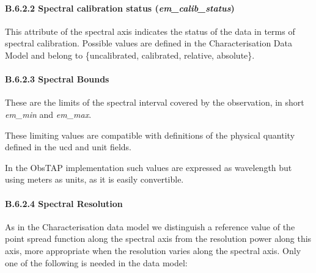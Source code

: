 \documentclass[11pt,a4paper]{ivoa}
\begin{document}
\paragraph{B.6.2.2 Spectral calibration status (\emph{em\_calib\_status})}
This attribute of the spectral axis indicates the status of the data in terms of spectral calibration. Possible values
are defined in the Characterisation Data Model and belong to \{uncalibrated, calibrated,  relative, absolute\}.

\paragraph{B.6.2.3 Spectral Bounds}
\label{bkm:Ref419133828}These are the limits of the spectral interval covered by the observation, in short \emph{em\_min} and
\emph{em\_max}.

These limiting values are compatible with definitions of the physical quantity defined in the ucd and unit fields.

In the ObsTAP implementation such values are expressed as wavelength but using meters as units, as it is easily
convertible.

\paragraph{B.6.2.4 Spectral Resolution}
As in the Characterisation data model we distinguish a reference value of the point spread function along the spectral
axis from the resolution power along this axis, more appropriate when the resolution varies along the spectral axis.
Only one of the following is needed in the data model:
\end{document}

